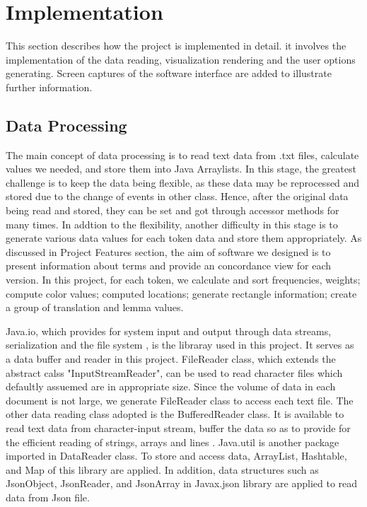 \clearpage
\section{Implementation}
This section describes how the project is implemented in detail. it involves the implementation of the data reading, visualization rendering and the user options generating. Screen captures of the software interface are added to illustrate further information.

\subsection{Data Processing}

The main concept of data processing is to read text data from .txt files, calculate values we needed, and store them into Java Arraylists. In this stage, the greatest challenge is to keep the data being flexible, as these data may be reprocessed and stored due to the change of events in other class. Hence, after the original data being read and stored, they can be set and got through accessor methods \cite{Bob's coding convention} for many times. In addtion to the flexibility, another difficulty in this stage is to generate various data values for each token data and store them appropriately. As discussed in Project Features section, the aim of software we designed is to present information about terms and provide an concordance view for each version. In this project, for each token, we calculate and sort frequencies, weights; compute color values; computed locations; generate rectangle information; create a group of translation and lemma values.

Java.io, which provides for system input and output through data streams, serialization and the file system \cite{javadoc java.io}, is the libraray used in this project. It serves as a data buffer and reader in this project. FileReader class, which extends the abstract calss "InputStreamReader", can be used to read character files which defaultly assuemed are in appropriate size. Since the volume of data in each document is not large, we generate FileReader class to access each text file. The other data reading class adopted is the BufferedReader class. It is available to read text data from character-input stream, buffer the data so as to provide for the efficient reading of strings, arrays and lines \cite{javadoc7}. Java.util is another package imported in DataReader class. To store and access data, ArrayList, Hashtable, and Map of this library are applied. In addition, data structures such as JsonObject, JsonReader, and JsonArray in Javax.json library are applied to read data from Json file.

